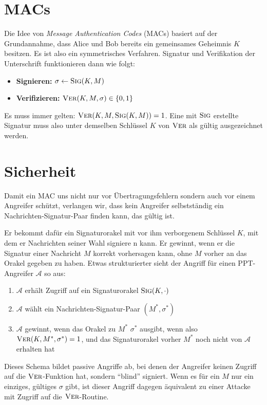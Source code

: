 \section{MACs}
Die Idee von \textit{Message Authentication Codes} (MACs) basiert auf der Grundannahme, dass Alice und Bob bereits ein gemeinsames Geheimnis $K$ besitzen. Es
ist also ein symmetrisches Verfahren. Signatur und Verifikation der Unterschrift funktionieren dann wie folgt:
\begin{itemize}
  \item \textbf{Signieren:} $\sigma \leftarrow \textsc{Sig}(K,M)$
  \item \textbf{Verifizieren:} $\textsc{Ver}(K,M,\sigma) \in \{0,1\}$
\end{itemize}
Es muss immer gelten: $\textsc{Ver}(K,M, \textsc{Sig}(K,M)) = 1$. Eine mit $\textsc{Sig}$ erstellte Signatur muss also unter demselben Schlüssel $K$ von $\textsc{Ver}$ als gültig ausgezeichnet
werden.

\section{Sicherheit}
\label{ch:symauth:sicherheit}
Damit ein MAC uns nicht nur vor Übertragungsfehlern sondern auch vor einem Angreifer schützt, verlangen wir, dass kein Angreifer selbstständig ein
Nachrichten-Signatur-Paar finden kann, das gültig ist.

Er bekommt dafür ein Signaturorakel mit vor ihm verborgenem Schlüssel $K$, mit dem er Nachrichten seiner Wahl signiere  n kann. Er
gewinnt, wenn er die Signatur einer Nachricht $M$ korrekt vorhersagen kann, ohne $M$ vorher an das Orakel gegeben zu haben. Etwas strukturierter sieht der
Angriff für einen PPT-Angreifer $\mathcal{A}$ so aus:
\begin{enumerate}
  \item $\mathcal{A}$ erhält Zugriff auf ein Signaturorakel $\textsc{Sig}(K,\cdot)$
  \item $\mathcal{A}$ wählt ein Nachrichten-Signatur-Paar $(M^*,\sigma^*)$
  \item $\mathcal{A}$ gewinnt, wenn das Orakel zu $M^*$ $\sigma^*$ ausgibt, wenn also $\textsc{Ver}(K,M^*,\sigma^*) = 1$, und das Signaturorakel vorher $M^*$ noch
  nicht von $\mathcal{A}$ erhalten hat
\end{enumerate}
Dieses Schema bildet passive Angriffe ab, bei denen der Angreifer keinen Zugriff auf die $\textsc{Ver}$-Funktion hat, sondern "`blind"' signiert. Wenn es für ein $M$
nur ein einziges, gültiges $\sigma$ gibt, ist dieser Angriff dagegen äquivalent zu einer Attacke mit Zugriff auf die $\textsc{Ver}$-Routine. 

